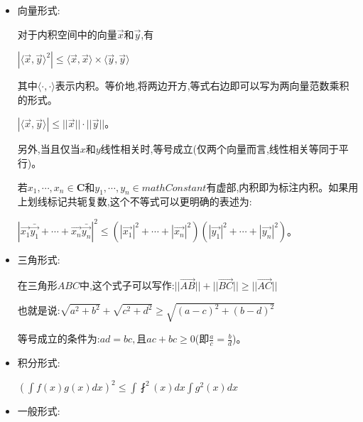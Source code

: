 \documentclass[UTF8]{ctexbook}
\newcommand{\upDownSum}[2]{\sum\limits_{#2}^{#1}}
\newcommand{\upDownProd}[2]{\prod\limits_{#2}^{#1}}
\newcommand{\defFunction}[1]{f(#1)}
\newcommand{\mathConstant}{\mathbf{C}}
\newcommand{\bigCase}[1]{\left(#1\right)}
\newcommand{\innerProduct}[2]{\langle#1,#2\rangle}
\begin{document}
{{{{\begin{itemize}
{          当且仅当$ab = cd$(即$\frac{a}{c} = \frac{b}{d}$)时。

          一般形式为$\upDownSum{n}{i = 1}a_i^2\upDownSum{n}{i = 1}b_i^2\geq\bigCase{\upDownSum{n}{i = 1}a_ib_i)}^2$

          当$\frac{a_1}{b_1} = \frac{a_2}{b_2} = \dots = \frac{a_n}{b_n}$或$a_i,b_i,i = 1,2,3,\dots,n$中至少有一方全为$0$时等号成立。

          一般形式推广:$(x_1 + y_1 + \dots)(x_2 + y_2 + \dots)\dots(x_n + y_n + \dots) \geq \left[\bigCase{\upDownProd{n}{i = 1}x_i}^\frac{1}{n} + \bigCase{\upDownProd{n}{i = 1}y_i}^\frac{1}{n} + \dots\right]^n$

          此推广形式又称卡尔松不等式,其表述是:在m×n矩阵中,各列元素之和的几何平均不小于各行元素的几何平均之和。二维形式是卡尔松不等式n=2时的特殊情况。
          }
    \item {
          向量形式:

          对于内积空间中的向量$\vec{x}$和$\vec{y}$,有

          $|\innerProduct{\vec{x}}{\vec{y}}^2| \leq \innerProduct{\vec{x}}{\vec{x}} \times \innerProduct{\vec{y}}{\vec{y}}$

          其中$\innerProduct{\cdot}{\cdot}$表示内积。等价地,将两边开方,等式右边即可以写为两向量范数乘积的形式。

          $|\innerProduct{\vec{x}}{\vec{y}}| \leq ||\vec{x}||\cdot||\vec{y}||$。

          另外,当且仅当$x$和$y$线性相关时,等号成立(仅两个向量而言,线性相关等同于平行)。

          若$x_1,\dotsm,x_n \in \mathConstant$和$y_1,\dotsm,y_n \in mathConstant$有虚部,内积即为标注内积。如果用上划线标记共轭复数,这个不等式可以更明确的表述为:

          $|\vec{x_1}\bar{\vec{y_1}} + \dotsm + \vec{x_n}\bar{\vec{y_n}}|^2\leq (|\vec{x_1}|^2 + \dotsm + |\vec{x_n}|^2)(|\vec{y_1}|^2 + \dotsm + |\vec{y_n}|^2)$。
          }
    \item {
          三角形式:

          在三角形$ABC$中,这个式子可以写作:$||\vec{AB}|| + ||\vec{BC}|| \geq ||\vec{AC}||$

          也就是说:$\sqrt{a^2 + b^2} + \sqrt{c^2 + d^2} \geq \sqrt{(a - c)^2 + (b - d)^2}$

          等号成立的条件为:$ad = bc,且ac + bc \geq 0$(即$\frac{a}{c} = \frac{b}{d}$)。
          }
    \item {
          积分形式:

          $\bigCase{\int\defFunction{x}g(x)dx}^2 \leq \int\fint^2(x)dx \int g^2(x)dx$
          }
    \item {
          一般形式:

}
\end{itemize}}}}}
\end{document}
